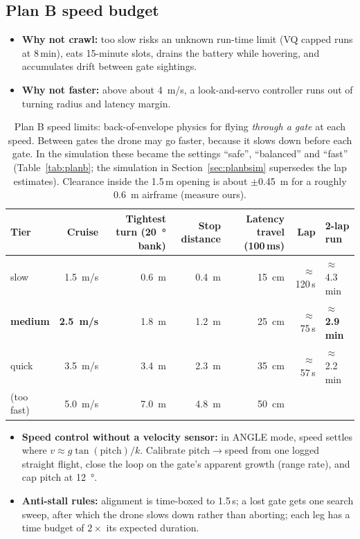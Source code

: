 \documentclass[10pt,a4paper]{article}
\begin{document}
\subsection{Plan B speed budget}
\begin{itemize}
\item \textbf{Why not crawl:} too slow risks an unknown run-time limit (VQ capped runs at 8\,min), eats 15-minute slots, drains the battery while hovering, and accumulates drift between gate sightings.
\item \textbf{Why not faster:} above about \SI{4}{m/s}, a look-and-servo controller runs out of turning radius and latency margin.
\end{itemize}
\begin{table}[H]\centering\small
\begin{tabular}{@{}lrrrrrl@{}}
\toprule
Tier & Cruise & Tightest turn (\SI{20}{\degree} bank) & Stop distance & Latency travel (100\,ms) & Lap & 2-lap run \\
\midrule
slow & \SI{1.5}{m/s} & \SI{0.6}{m} & \SI{0.4}{m} & \SI{15}{cm} & $\approx$120\,s & $\approx$4.3\,min \\
\textbf{medium} & \textbf{\SI{2.5}{m/s}} & \SI{1.8}{m} & \SI{1.2}{m} & \SI{25}{cm} & $\approx$75\,s & $\approx$\textbf{2.9\,min} \\
quick & \SI{3.5}{m/s} & \SI{3.4}{m} & \SI{2.3}{m} & \SI{35}{cm} & $\approx$57\,s & $\approx$2.2\,min \\
(too fast) & \SI{5.0}{m/s} & \SI{7.0}{m} & \SI{4.8}{m} & \SI{50}{cm} & & \\
\bottomrule
\end{tabular}
\caption{Plan B speed limits: back-of-envelope physics for flying \emph{through a gate} at each speed. Between gates the drone may go faster, because it slows down before each gate. In the simulation these became the settings ``safe'', ``balanced'' and ``fast'' (Table~\ref{tab:planb}; the simulation in Section~\ref{sec:planbsim} supersedes the lap estimates). Clearance inside the 1.5\,m opening is about $\pm$\SI{0.45}{m} for a roughly \SI{0.6}{m} airframe (measure ours).}
\end{table}
\begin{itemize}
\item \textbf{Speed control without a velocity sensor:} in ANGLE mode, speed settles where $v \approx g\tan(\text{pitch})/k$. Calibrate pitch$\rightarrow$speed from one logged straight flight, close the loop on the gate's apparent growth (range rate), and cap pitch at \SI{12}{\degree}.
\item \textbf{Anti-stall rules:} alignment is time-boxed to 1.5\,s; a lost gate gets one search sweep, after which the drone slows down rather than aborting; each leg has a time budget of $2\times$ its expected duration.
\end{itemize}
\end{document}
